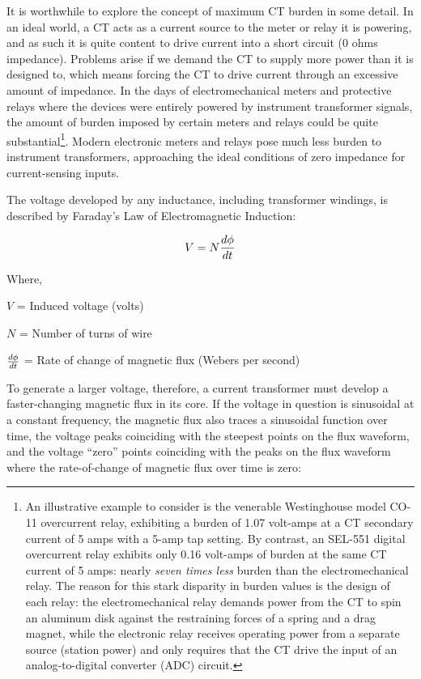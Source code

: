 It is worthwhile to explore the concept of maximum CT burden in some detail.  In an ideal world, a CT acts as a current source to the meter or relay it is powering, and as such it is quite content to drive current into a short circuit (0 ohms impedance).  Problems arise if we demand the CT to supply more power than it is designed to, which means forcing the CT to drive current through an excessive amount of impedance.  In the days of electromechanical meters and protective relays where the devices were entirely powered by instrument transformer signals, the amount of burden imposed by certain meters and relays could be quite substantial\footnote{An illustrative example to consider is the venerable Westinghouse model CO-11 overcurrent relay, exhibiting a burden of 1.07 volt-amps at a CT secondary current of 5 amps with a 5-amp tap setting.  By contrast, an SEL-551 digital overcurrent relay exhibits only 0.16 volt-amps of burden at the same CT current of 5 amps: nearly \textit{seven times less} burden than the electromechanical relay.  The reason for this stark disparity in burden values is the design of each relay: the electromechanical relay demands power from the CT to spin an aluminum disk against the restraining forces of a spring and a drag magnet, while the electronic relay receives operating power from a separate source (station power) and only requires that the CT drive the input of an analog-to-digital converter (ADC) circuit.}.  Modern electronic meters and relays pose much less burden to instrument transformers, approaching the ideal conditions of zero impedance for current-sensing inputs.  

The voltage developed by any inductance, including transformer windings, is described by Faraday's Law of Electromagnetic Induction:  
  
$$V = N{d \phi \over dt}$$

\noindent
Where,

$V$ = Induced voltage (volts)

$N$ = Number of turns of wire

$d \phi \over dt$ = Rate of change of magnetic flux (Webers per second)

\vskip 10pt

To generate a larger voltage, therefore, a current transformer must develop a faster-changing magnetic flux in its core.  If the voltage in question is sinusoidal at a constant frequency, the magnetic flux also traces a sinusoidal function over time, the voltage peaks coinciding with the steepest points on the flux waveform, and the voltage ``zero'' points coinciding with the peaks on the flux waveform where the rate-of-change of magnetic flux over time is zero:


